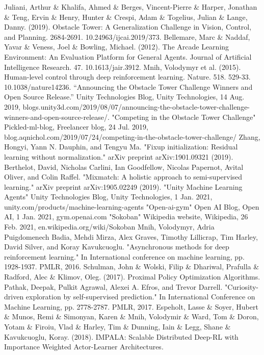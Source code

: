 \documentclass[conference]{IEEEtran}
\begin{document}
\begin{thebibliography}{00}
 Juliani, Arthur \& Khalifa, Ahmed \& Berges, Vincent-Pierre \& Harper, Jonathan \& Teng, Ervin \& Henry, Hunter \& Crespi, Adam \& Togelius, Julian \& Lange, Danny. (2019). Obstacle Tower: A Generalization Challenge in Vision, Control, and Planning. 2684-2691. 10.24963/ijcai.2019/373.
 Bellemare, Marc \& Naddaf, Yavar \& Veness, Joel \& Bowling, Michael. (2012). The Arcade Learning Environment: An Evaluation Platform for General Agents. Journal of Artificial Intelligence Research. 47. 10.1613/jair.3912.
 Mnih, Volodymyr et al. (2015). Human-level control through deep reinforcement learning. Nature. 518. 529-33. 10.1038/nature14236.
 “Announcing the Obstacle Tower Challenge Winners and Open Source Release.” Unity Technologies Blog, Unity Technologies, 14 Aug. 2019, blogs.unity3d.com/2019/08/07/announcing-the-obstacle-tower-challenge-winners-and-open-source-release/.
 "Competing in the Obstacle Tower Challenge" Pickled-ml-blog, Freelancer blog, 24 Jul. 2019, blog.aqnichol.com/2019/07/24/competing-in-the-obstacle-tower-challenge/
 Zhang, Hongyi, Yann N. Dauphin, and Tengyu Ma. "Fixup initialization: Residual learning without normalization." arXiv preprint arXiv:1901.09321 (2019).
 Berthelot, David, Nicholas Carlini, Ian Goodfellow, Nicolas Papernot, Avital Oliver, and Colin Raffel. "Mixmatch: A holistic approach to semi-supervised learning." arXiv preprint arXiv:1905.02249 (2019).
 "Unity Machine Learning Agents" Unity Technologies Blog, Unity Technologies, 1 Jan. 2021, unity.com/products/machine-learning-agents
 "Open-ai-gym" Open AI Blog, Open AI, 1 Jan. 2021, gym.openai.com
 "Sokoban" Wikipedia website, Wikipedia, 26 Feb. 2021, en.wikipedia.org/wiki/Sokoban
 Mnih, Volodymyr, Adria Puigdomenech Badia, Mehdi Mirza, Alex Graves, Timothy Lillicrap, Tim Harley, David Silver, and Koray Kavukcuoglu. "Asynchronous methods for deep reinforcement learning." In International conference on machine learning, pp. 1928-1937. PMLR, 2016.
 Schulman, John \& Wolski, Filip \& Dhariwal, Prafulla \& Radford, Alec \& Klimov, Oleg. (2017). Proximal Policy Optimization Algorithms.
 Pathak, Deepak, Pulkit Agrawal, Alexei A. Efros, and Trevor Darrell. "Curiosity-driven exploration by self-supervised prediction." In International Conference on Machine Learning, pp. 2778-2787. PMLR, 2017.
 Espeholt, Lasse \& Soyer, Hubert \& Munos, Remi \& Simonyan, Karen \& Mnih, Volodymir \& Ward, Tom \& Doron, Yotam \& Firoiu, Vlad \& Harley, Tim \& Dunning, Iain \& Legg, Shane \& Kavukcuoglu, Koray. (2018). IMPALA: Scalable Distributed Deep-RL with Importance Weighted Actor-Learner Architectures.
\end{thebibliography}
\vspace{12pt}
\end{document}
